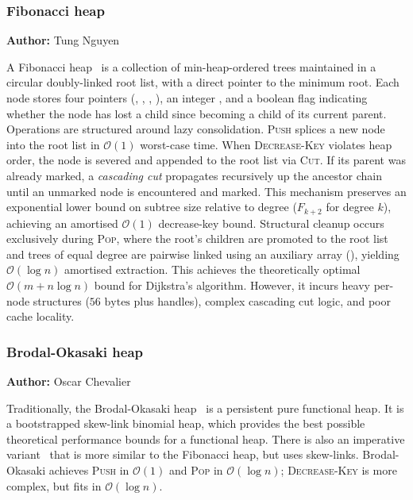 \subsubsection{Fibonacci heap}
\vspace{-0.2cm}
{\small \textbf{Author:} Tung Nguyen}

\vspace{0.2cm}
\noindent
A Fibonacci heap~\cite{fredman1987fibonacci} is a collection of min-heap-ordered trees maintained in a circular doubly-linked root list, with a direct pointer to the minimum root. Each node stores four pointers (, , , ), an integer , and a boolean  flag indicating whether the node has lost a child since becoming a child of its current parent.
Operations are structured around lazy consolidation. \textsc{Push} splices a new node into the root list in $\mathcal{O}(1)$ worst-case time. When \textsc{Decrease-Key} violates heap order, the node is severed and appended to the root list via \textsc{Cut}. If its parent was already marked, a \emph{cascading cut} propagates recursively up the ancestor chain until an unmarked node is encountered and marked. This mechanism preserves an exponential lower bound on subtree size relative to degree ($F_{k+2}$ for degree $k$), achieving an amortised $\mathcal{O}(1)$ decrease-key bound. Structural cleanup occurs exclusively during \textsc{Pop}, where the root's children are promoted to the root list and trees of equal degree are pairwise linked using an auxiliary array (), yielding $\mathcal{O}(\log n)$ amortised extraction. This achieves the theoretically optimal $\mathcal{O}(m + n \log n)$ bound for Dijkstra's algorithm. However, it incurs heavy per-node structures ($56\text{ bytes}$ plus handles), complex cascading cut logic, and poor cache locality.

\subsubsection{Brodal-Okasaki heap}
\vspace{-0.2cm}
{\small \textbf{Author:} Oscar Chevalier}

\vspace{0.2cm}
\noindent
Traditionally, the Brodal-Okasaki heap~\cite{brodal1996optimal} is a persistent pure functional heap. It is a
bootstrapped skew-link binomial heap, which provides the best possible
theoretical performance bounds for a functional heap. There is also an imperative variant~\cite{brodal1996worst}
that is more similar to the Fibonacci heap, but uses skew-links. Brodal-Okasaki
achieves \textsc{Push} in $\mathcal{O}(1)$ and \textsc{Pop} in $\mathcal{O}(\log n)$;
\textsc{Decrease-Key} is more complex, but fits in $\mathcal{O}(\log n)$.

